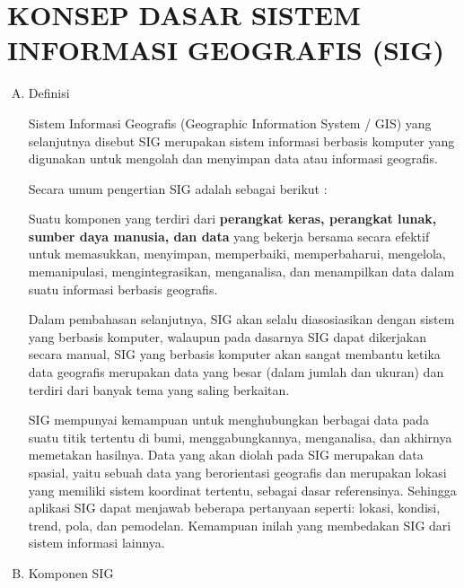 

\chapter{KONSEP DASAR SISTEM INFORMASI GEOGRAFIS (SIG)}

\begin{enumerate}[A.]
\item{Definisi}

Sistem Informasi Geografis (Geographic Information System / GIS) yang selanjutnya disebut SIG merupakan sistem informasi berbasis komputer yang digunakan untuk mengolah dan menyimpan data atau informasi geografis.

Secara umum pengertian SIG adalah sebagai berikut :
\begin{italicquotes}
Suatu komponen yang terdiri dari \textbf{perangkat keras, perangkat lunak, sumber daya manusia, dan data} yang bekerja bersama secara efektif untuk memasukkan, menyimpan, memperbaiki, memperbaharui, mengelola, memanipulasi, mengintegrasikan, menganalisa, dan menampilkan data dalam suatu informasi berbasis geografis.
\end{italicquotes}

Dalam pembahasan selanjutnya, SIG akan selalu diasosiasikan dengan sistem yang berbasis komputer, walaupun pada dasarnya SIG dapat dikerjakan secara manual, SIG yang berbasis komputer akan sangat membantu ketika data geografis merupakan data yang besar (dalam jumlah dan ukuran) dan terdiri dari banyak tema yang saling berkaitan.

SIG mempunyai kemampuan untuk menghubungkan berbagai data pada suatu titik tertentu di bumi, menggabungkannya, menganalisa, dan akhirnya memetakan hasilnya. Data yang akan diolah pada SIG merupakan data spasial, yaitu sebuah data yang berorientasi geografis dan merupakan lokasi yang memiliki sistem koordinat tertentu, sebagai dasar referensinya. Sehingga aplikasi SIG dapat menjawab beberapa pertanyaan seperti: lokasi, kondisi, trend, pola, dan pemodelan. Kemampuan inilah yang membedakan SIG dari sistem informasi lainnya.

\item{Komponen SIG}
\end{enumerate}
